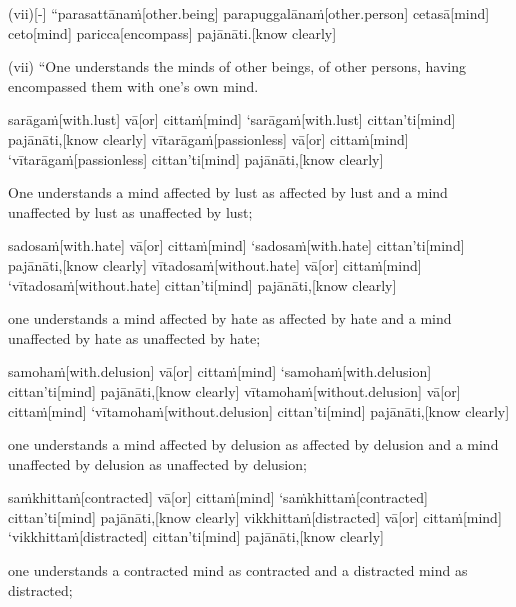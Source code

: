 \begin{samepage}
\begingl[glneveryline={\PaliGlossA,\PaliGlossB}]
(vii)[-] “parasattānaṁ[other.being] parapuggalānaṁ[other.person] cetasā[mind] ceto[mind] paricca[encompass] pajānāti.[know clearly]
\endgl
\nopagebreak
\linespread{0.5}
\begin{spacin}{0.2}
{\PaliGlossFT (vii) “One understands the minds of other beings, of other persons, having encompassed them with one’s own mind.}
\end{spacin}
\vskip 12pt
\end{samepage}
\begin{samepage}
\begingl[glneveryline={\PaliGlossA,\PaliGlossB}]
sarāgaṁ[with.lust] vā[or] cittaṁ[mind] ‘sarāgaṁ[with.lust] cittan’ti[mind] pajānāti,[know clearly] vītarāgaṁ[passionless] vā[or] cittaṁ[mind] ‘vītarāgaṁ[passionless] cittan’ti[mind] pajānāti,[know clearly]
\endgl
\nopagebreak
\linespread{0.5}
\begin{spacin}{0.2}
{\PaliGlossFT One understands a mind affected by lust as affected by lust and a mind unaffected by lust as unaffected by lust;}
\end{spacin}
\vskip 12pt
\end{samepage}
\begin{samepage}
\begingl[glneveryline={\PaliGlossA,\PaliGlossB}]
sadosaṁ[with.hate] vā[or] cittaṁ[mind] ‘sadosaṁ[with.hate] cittan’ti[mind] pajānāti,[know clearly] vītadosaṁ[without.hate] vā[or] cittaṁ[mind] ‘vītadosaṁ[without.hate] cittan’ti[mind] pajānāti,[know clearly]
\endgl
\nopagebreak
\linespread{0.5}
\begin{spacin}{0.2}
{\PaliGlossFT one understands a mind affected by hate as affected by hate and a mind unaffected by hate as unaffected by hate;}
\end{spacin}
\vskip 12pt
\end{samepage}
\begin{samepage}
\begingl[glneveryline={\PaliGlossA,\PaliGlossB}]
samohaṁ[with.delusion] vā[or] cittaṁ[mind] ‘samohaṁ[with.delusion] cittan’ti[mind] pajānāti,[know clearly] vītamohaṁ[without.delusion] vā[or] cittaṁ[mind] ‘vītamohaṁ[without.delusion] cittan’ti[mind] pajānāti,[know clearly]
\endgl
\nopagebreak
\linespread{0.5}
\begin{spacin}{0.2}
{\PaliGlossFT one understands a mind affected by delusion as affected by delusion and a mind unaffected by delusion as unaffected by delusion;}
\end{spacin}
\vskip 12pt
\end{samepage}
\begin{samepage}
\begingl[glneveryline={\PaliGlossA,\PaliGlossB}]
saṁkhittaṁ[contracted] vā[or] cittaṁ[mind] ‘saṁkhittaṁ[contracted] cittan’ti[mind] pajānāti,[know clearly] vikkhittaṁ[distracted] vā[or] cittaṁ[mind] ‘vikkhittaṁ[distracted] cittan’ti[mind] pajānāti,[know clearly]
\endgl
\nopagebreak
\linespread{0.5}
\begin{spacin}{0.2}
{\PaliGlossFT one understands a contracted mind as contracted and a distracted mind as distracted;}
\end{spacin}
\vskip 12pt
\end{samepage}
